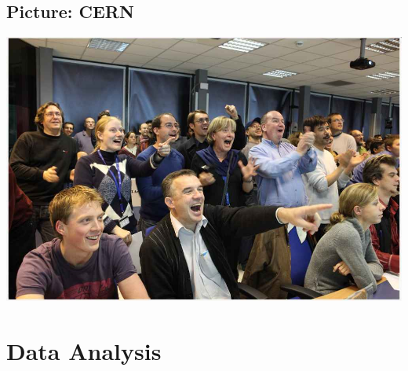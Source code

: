 \subsection{Picture: CERN}
\begin{frame}



\begin{minipage}{0.49\textwidth}
  \end{minipage}  \begin{minipage}{0.49\textwidth}

\includegraphics[width=\textwidth]{Figures Lecture on Datanalysis/ATLAS_Energy_People.jpg}
\end{minipage}
\end{frame}


\section{Data Analysis} 

